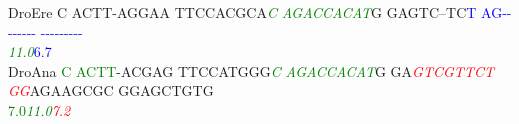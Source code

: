 \documentclass[11pt,twoside,reqno,a4paper]{article}
\begin{document}
{DroEre	C	ACTT-AGGAA	TTCCACGCA\textit{\textcolor{Green}{C}}	\textit{\textcolor{Green}{A}}\textit{\textcolor{Green}{G}}\textit{\textcolor{Green}{A}}\textit{\textcolor{Green}{C}}\textit{\textcolor{Green}{C}}\textit{\textcolor{Green}{A}}\textit{\textcolor{Green}{C}}\textit{\textcolor{Green}{A}}\textit{\textcolor{Green}{T}}G	GAGTC--TC\textcolor{Blue}{T}	\textcolor{Blue}{A}\textcolor{Blue}{G}\textcolor{Blue}{-}\textcolor{Blue}{-}\textcolor{Blue}{-}\textcolor{Blue}{-}\textcolor{Blue}{-}\textcolor{Blue}{-}\textcolor{Blue}{-}\textcolor{Blue}{-}	\textcolor{Blue}{-}\textcolor{Blue}{-}\textcolor{Blue}{-}\textcolor{Blue}{-}\textcolor{Blue}{-}\textcolor{Blue}{-}\textcolor{Blue}{-}\textcolor{Blue}{-}\textcolor{Blue}{-}\\
\hspace*{7\charwidth}\hspace*{1\charwidth}\hspace*{1\charwidth}\hspace*{20\charwidth}\textit{\textcolor{Green}{11.0}}\hspace*{1\charwidth}\hspace*{1\charwidth}\hspace*{16\charwidth}\textcolor{Blue}{6.7}\hspace*{1\charwidth}\hspace*{1\charwidth}\\
DroAna	\textcolor{Green}{C}	\textcolor{Green}{A}\textcolor{Green}{C}\textcolor{Green}{T}\textcolor{Green}{T}-ACGAG	TTCCATGGG\textit{\textcolor{Green}{C}}	\textit{\textcolor{Green}{A}}\textit{\textcolor{Green}{G}}\textit{\textcolor{Green}{A}}\textit{\textcolor{Green}{C}}\textit{\textcolor{Green}{C}}\textit{\textcolor{Green}{A}}\textit{\textcolor{Green}{C}}\textit{\textcolor{Green}{A}}\textit{\textcolor{Green}{T}}G	GA\textit{\textcolor{Red}{G}}\textit{\textcolor{Red}{T}}\textit{\textcolor{Red}{C}}\textit{\textcolor{Red}{G}}\textit{\textcolor{Red}{T}}\textit{\textcolor{Red}{T}}\textit{\textcolor{Red}{C}}\textit{\textcolor{Red}{T}}	\textit{\textcolor{Red}{G}}\textit{\textcolor{Red}{G}}AGAAGCGC	GGAGCTGTG\\
\hspace*{7\charwidth}\hspace*{0\charwidth}\textcolor{Green}{7.0}\hspace*{1\charwidth}\hspace*{1\charwidth}\hspace*{17\charwidth}\textit{\textcolor{Green}{11.0}}\hspace*{1\charwidth}\hspace*{1\charwidth}\hspace*{9\charwidth}\textit{\textcolor{Red}{7.2}}\hspace*{1\charwidth}\hspace*{1\charwidth}\\
}
\end{document}
